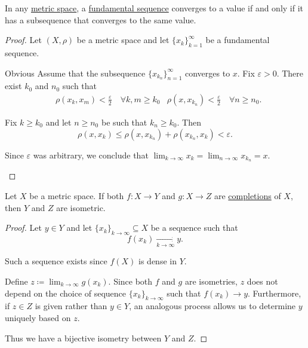 \begin{proposition}\label{thm:fundamental_subsequence_convergence}
  In any \hyperref[def:complete_metric_space]{metric space}, a \hyperref[def:fundamental_net]{fundamental sequence} converges to a value if and only if it has a subsequence that converges to the same value.
\end{proposition}
\begin{proof}
  Let \( (X, \rho) \) be a metric space and let \( \{ x_k \}_{k=1}^\infty \) be a fundamental sequence.

  \begin{description}
    \Implies Obvious
    \ImpliedBy Assume that the subsequence \( \{ x_{k_n} \}_{n=1}^\infty \) converges to \( x \). Fix \( \varepsilon > 0 \). There exist \( k_0 \) and \( n_0 \) such that
    \begin{align*}
      &\rho(x_k, x_m) < \tfrac \varepsilon 2 \quad\forall k, m \geq k_0
      &\rho(x, x_{k_n}) < \tfrac \varepsilon 2 \quad\forall n \geq n_0.
    \end{align*}

    Fix \( k \geq k_0 \) and let \( n \geq n_0 \) be such that \( k_n \geq k_0 \). Then
    \begin{equation*}
      \rho(x, x_k) \leq \rho(x, x_{k_n}) + \rho(x_{k_n}, x_k) < \varepsilon.
    \end{equation*}

    Since \( \varepsilon \) was arbitrary, we conclude that \( \lim_{k \to \infty} x_k = \lim_{n \to \infty} x_{k_n} = x \).
  \end{description}
\end{proof}

\begin{lemma}\label{thm:metric_space_completion_uniqueness}
  Let \( X \) be a metric space. If both \( f: X \to Y \) and \( g: X \to Z \) are \hyperref[def:complete_metric_space]{completions} of \( X \), then \( Y \) and \( Z \) are isometric.
\end{lemma}
\begin{proof}
  Let \( y \in Y \) and let \( \{ x_k \}_{k \to \infty} \subseteq X \) be a sequence such that
  \begin{equation*}
    f(x_k) \xrightarrow[k \to \infty]{} y.
  \end{equation*}

  Such a sequence exists since \( f(X) \) is dense in \( Y \).

  Define \( z \coloneqq \lim_{k \to \infty} g(x_k) \). Since both \( f \) and \( g \) are isometries, \( z \) does not depend on the choice of sequence \( \{ x_k \}_{k \to \infty} \) such that \( f(x_k) \to y \). Furthermore, if \( z \in Z \) is given rather than \( y \in Y \), an analogous process allows us to determine \( y \) uniquely based on \( z \).

  Thus we have a bijective isometry between \( Y \) and \( Z \).
\end{proof}

